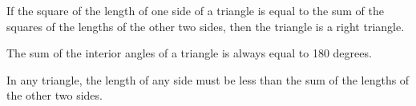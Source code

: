 \documentclass[../main.tex]{subfiles}
\begin{document}
\begin{corollary}
    If the square of the length of one side of a triangle is equal to the sum of the squares of the lengths of the other two sides, then the triangle is a right triangle.
\end{corollary}

\begin{proposition}
    The sum of the interior angles of a triangle is always equal to 180 degrees.
\end{proposition}

\begin{lemma}
    In any triangle, the length of any side must be less than the sum of the lengths of the other two sides.
\end{lemma}
\end{document}

